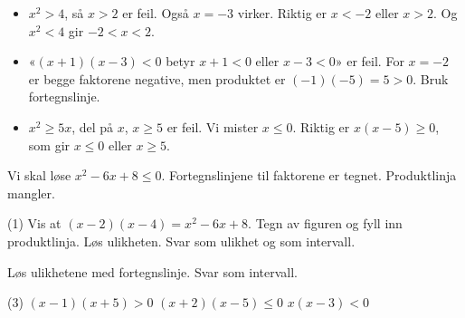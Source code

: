 \begin{vanligfeil}
\begin{itemize}[leftmargin=1.2em,itemsep=1pt,topsep=0pt]
  \item $x^2 > 4$, så $x > 2$ er feil. Også $x = -3$ virker. Riktig er $x < -2$ eller $x > 2$. Og $x^2 < 4$ gir $-2 < x < 2$.
  \item «$(x+1)(x-3) < 0$ betyr $x + 1 < 0$ eller $x - 3 < 0$» er feil. For $x = -2$ er begge faktorene negative, men produktet er $(-1)(-5) = 5 > 0$. Bruk fortegnslinje.
  \item $x^2 \ge 5x$, del på $x$, $x \ge 5$ er feil. Vi mister $x \le 0$. Riktig er $x(x - 5) \ge 0$, som gir $x \le 0$ eller $x \ge 5$.
\end{itemize}
\end{vanligfeil}


Vi skal løse $x^2 - 6x + 8 \le 0$. Fortegnslinjene til faktorene er tegnet. Produktlinja mangler.
\begin{tasks}(1)
  \task Vis at $(x-2)(x-4) = x^2 - 6x + 8$.
  \task Tegn av figuren og fyll inn produktlinja.
  \task Løs ulikheten. Svar som ulikhet og som intervall.
\end{tasks}

\begin{center}
\end{center}

Løs ulikhetene med fortegnslinje. Svar som intervall.
\begin{tasks}(3)
  \task $(x - 1)(x + 5) > 0$
  \task $(x + 2)(x - 5) \le 0$
  \task $x(x - 3) < 0$
\end{tasks}

